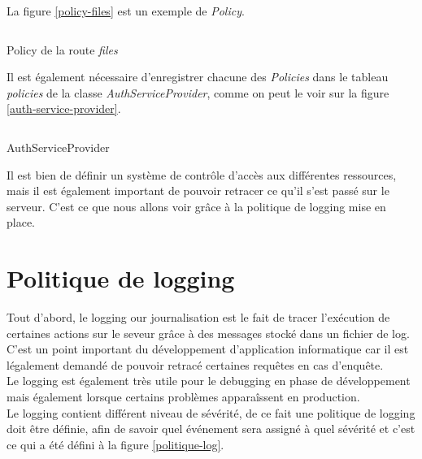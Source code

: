 \documentclass[
    iai, %
    il, %
]{heig-tb}
\begin{document}
La figure \ref{policy-files} est un exemple de \emph{Policy}.

\begin{listing}[h]
    \inputminted{php}{assets/code/FilePolicy.php}
    \caption{Policy de la route \emph{files} \label{policy-files}}
\end{listing}

Il est également nécessaire d'enregistrer chacune des \emph{Policies} dans le tableau \emph{policies} de la classe \emph{AuthServiceProvider}, comme on peut le voir sur la figure \ref{auth-service-provider}.

\begin{listing}[h]
    \inputminted{php}{assets/code/FilePolicy.php}
    \caption{AuthServiceProvider \label{auth-service-provider}}
\end{listing}

Il est bien de définir un système de contrôle d'accès aux différentes ressources, mais il est également important de pouvoir retracer ce qu'il s'est passé sur le serveur. C'est ce que nous allons voir grâce à la politique de logging mise en place.

\section{Politique de logging}
Tout d'abord, le logging our journalisation est le fait de tracer l'exécution de certaines actions sur le seveur grâce à des messages stocké dans un fichier de log. \\
C'est un point important du développement d'application informatique car il est légalement demandé de pouvoir retracé certaines requêtes en cas d'enquête. \\
Le logging est également très utile pour le debugging en phase de développement mais également lorsque certains problèmes apparaîssent en production. \\
Le logging contient différent niveau de sévérité, de ce fait une politique de logging doit être définie, afin de savoir quel événement sera assigné à quel sévérité et c'est ce qui a été défini à la figure \ref{politique-log}.
\end{document}
